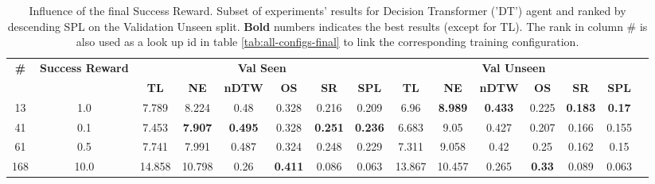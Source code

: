 \begin{table}
\centering
\caption{\label{tab:dt_reward_scale}Influence of the final Success Reward. Subset of experiments' results for Decision Transformer ('DT') agent and ranked by descending SPL on the Validation Unseen split. \textbf{Bold} numbers indicates the best results (except for TL). The rank in column \# is also used as a look up id in table \ref{tab:all-configs-final} to link the corresponding training configuration.}
\begin{tabular}{@{\hskip3pt}c@{\hskip3pt}c@{\hskip3pt}c@{\hskip3pt}c@{\hskip3pt}c@{\hskip3pt}c@{\hskip3pt}c@{\hskip3pt}c@{\hskip3pt}c@{\hskip3pt}c@{\hskip3pt}c@{\hskip3pt}c@{\hskip3pt}c@{\hskip3pt}c@{\hskip3pt}c}
\toprule
                                  \textbf{\#} & \textbf{Success Reward } & \multicolumn{6}{c}{\textbf{Val Seen}} & \multicolumn{6}{c}{\textbf{Val Unseen}} \\
\cmidrule(l){3-8}\cmidrule(l){9-14}\textbf{~} &               \textbf{~} &       \textbf{TL} &     \textbf{NE} &   \textbf{nDTW} &     \textbf{OS} &     \textbf{SR} &    \textbf{SPL} &         \textbf{TL} &     \textbf{NE} &   \textbf{nDTW} &    \textbf{OS} &     \textbf{SR} &   \textbf{SPL} \\
\midrule
                                           13 &                      1.0 &             7.789 &           8.224 &            0.48 &           0.328 &           0.216 &           0.209 &                6.96 &  \textbf{8.989} &  \textbf{0.433} &          0.225 &  \textbf{0.183} &  \textbf{0.17} \\
                                           41 &                      0.1 &             7.453 &  \textbf{7.907} &  \textbf{0.495} &           0.328 &  \textbf{0.251} &  \textbf{0.236} &               6.683 &            9.05 &           0.427 &          0.207 &           0.166 &          0.155 \\
                                           61 &                      0.5 &             7.741 &           7.991 &           0.487 &           0.324 &           0.248 &           0.229 &               7.311 &           9.058 &            0.42 &           0.25 &           0.162 &           0.15 \\
                                          168 &                     10.0 &            14.858 &          10.798 &            0.26 &  \textbf{0.411} &           0.086 &           0.063 &              13.867 &          10.457 &           0.265 &  \textbf{0.33} &           0.089 &          0.063 \\
\bottomrule
\end{tabular}
\end{table}
